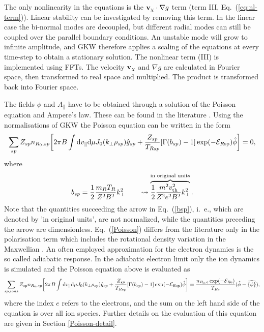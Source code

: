 The only nonlinearity in the equations is the ${\bf v}_\chi \cdot \nabla g$ term (term III, Eq.~(\ref{eq:nl-term})). Linear stability
can be investigated by removing this term. 
In the linear case the bi-normal modes are decoupled, but different radial modes can still be coupled over the parallel boundary conditions. 
An unstable mode will grow to infinite amplitude, and GKW therefore applies a scaling of the 
equations at every time-step to obtain a stationary solution. 
The nonlinear term (III) is implemented using FFTs. 
The velocity ${\bf v}_\chi$ and $\nabla g$ are calculated in Fourier space, then transformed to real space and multiplied. 
The product is transformed back into Fourier space. 

The fields $\phi$ and $A_\parallel$ have to be obtained through a solution of the Poisson equation and Ampere's law. 
These can be found in the literature \cite{BRI08}. Using the normalisations of GKW the Poisson equation can be written in the form 
\begin{align}
\label{Poisson}
 \sum_{sp}  Z_{sp} n_{R_0,sp} \biggl [ 2 \pi B \int {\rm d} v_{\parallel} {\rm d} \mu J_0(k_\perp\rho_{sp}) \hat g_{sp} + {Z_{sp} \over T_{Rsp}} [ \Gamma(b_{sp}) -1]\exp(-\mathcal{E}_{R{\rm sp}}) \hat \phi \biggr ] = 0 , 
\end{align}
where 
\begin{equation} 
\label{bsp}
b_{sp} = {1 \over 2} {m_R T_R \over Z^2 B^2} k_{\perp}^2 \qquad\leadsto  \overbrace{ {1 \over 2} {m^2 v_{\rm th}^2 \over Z^2 e^2 B^2} k_\perp^2}^{\textrm{\scriptsize in original units}} . %
\end{equation}
Note that the quantities succeeding the arrow in Eq.~(\ref{bsp}), i.~e., which are denoted by 'in original units', are not normalized, while the quantities preceding the arrow are dimensionless.
Eq.~(\ref{Poisson}) differs from the literature \cite{BRI08} only in the polarisation term which includes the rotational density variation in the Maxwellian \cite{Casson-Thesis}.  An often employed approximation for the electron dynamics is the so called adiabatic response. 
In the adiabatic electron limit only the ion dynamics is simulated and the Poisson equation above is evaluated as 
\begin{align}
\label{Poisson-adiabatic}
 \sum_{sp , ions }  Z_{sp} n_{R_0,sp} \biggl [ 2 \pi B \int {\rm d} v_{\parallel} {\rm d} \mu J_0(k_\perp\rho_{sp}) \hat g_{sp} + {Z_{sp} \over T_{Rsp}} [ \Gamma(b_{sp}) -1]\exp(-\mathcal{E}_{R{\rm sp}}) \hat \phi \biggr ] =  { n_{R_0,e}\exp(-\mathcal{E}_{R{\rm e}})
\over T_{Re}} ( \hat \phi - \widehat{\{ \phi \}}) ,
\end{align}
where the index $e$ refers to the electrons, and the sum on the left hand side of the equation is over all ion species.   Further details on the evaluation of this equation are given in Section \ref{Poisson-detail}.

